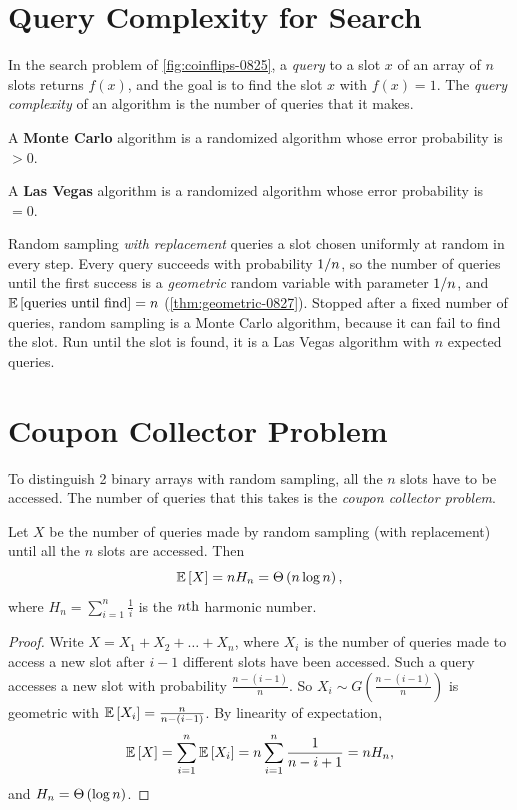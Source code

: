 
\section{Query Complexity for Search}

In the search problem of \cref{fig:coinflips-0825}, a \emph{query} to a slot $x$ of an array of $n$
slots returns $f(x)$, and the goal is to find the slot $x$ with $f(x) = 1$. The \emph{query complexity}
of an algorithm is the number of queries that it makes.

\begin{definition}\label{def:mclv-0901}
    A \textbf{Monte Carlo} algorithm is a randomized algorithm whose error probability is $> 0$.

    A \textbf{Las Vegas} algorithm is a randomized algorithm whose error probability is $= 0$.
\end{definition}

Random sampling \emph{with replacement} queries a slot chosen uniformly at random in every step. Every
query succeeds with probability $1/n$, so the number of queries until the first success is a
\emph{geometric} random variable with parameter $1/n$, and
$\operatorname{\mathbb{E}}\left[\text{queries until find}\right] = n$ (\cref{thm:geometric-0827}).
Stopped after a fixed number of queries, random sampling is a Monte Carlo algorithm, because it
can fail to find the slot. Run until the slot is found, it is a Las Vegas algorithm with $n$
expected queries.

\section{Coupon Collector Problem}

To distinguish 2 binary arrays with random sampling, all the $n$ slots have to be accessed. The
number of queries that this takes is the \emph{coupon collector problem}.

\begin{theorem}\label{thm:coupon}
    Let $X$ be the number of queries made by random sampling (with replacement) until all the
    $n$ slots are accessed. Then
    \[\operatorname{\mathbb{E}}\left[X\right] = n H_n = \Theta\left(n \log n\right),\]
    where $H_n = \sum_{i=1}^{n} \frac{1}{i}$ is the $n\text{th}$ harmonic number.
\end{theorem}

\begin{proof}
    Write $X = X_1 + X_2 + \dots + X_n$, where $X_i$ is the number of queries made to access a new
    slot after $i-1$ different slots have been accessed. Such a query accesses a new slot
    with probability $\frac{n-(i-1)}{n}$. So $X_i \sim G\left(\frac{n-(i-1)}{n}\right)$ is geometric
    with $\operatorname{\mathbb{E}}\left[X_i\right] = \frac{n}{n-(i-1)}$. By linearity of expectation,
    \[\operatorname{\mathbb{E}}\left[X\right] = \sum_{i=1}^{n} \operatorname{\mathbb{E}}\left[X_i\right] = n \sum_{i=1}^{n} \frac{1}{n-i+1} = n H_n,\]
    and $H_n = \Theta\left(\log n\right)$.
\end{proof}


